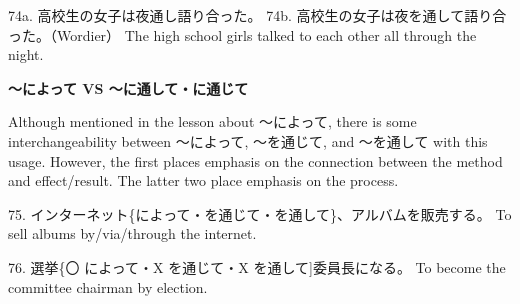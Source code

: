 \par{74a. 高校生の女子は夜通し語り合った。 \hfill\break
74b. 高校生の女子は夜を通して語り合った。（Wordier） \hfill\break
The high school girls talked to each other all through the night. }

\begin{center}
 \textbf{～によって VS ～に通して・に通じて }
\end{center}

\par{ Although mentioned in the lesson about ～によって, there is some interchangeability between ～によって, ～を通じて, and ～を通して with this usage. However, the first places emphasis on the connection between the method and effect\slash result. The latter two place emphasis on the process. }

\par{75. インターネット\{によって・を通じて・を通して\}、アルバムを販売する。 \hfill\break
To sell albums by\slash via\slash through the internet. }

\par{76. 選挙\{〇 によって・X を通じて・X を通して]委員長になる。 \hfill\break
To become the committee chairman by election. }
    